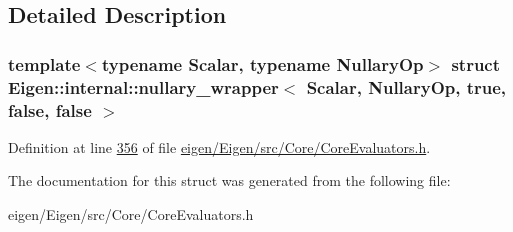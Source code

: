 \subsection{Detailed Description}
\subsubsection*{template$<$typename Scalar, typename Nullary\+Op$>$\newline
struct Eigen\+::internal\+::nullary\+\_\+wrapper$<$ Scalar, Nullary\+Op, true, false, false $>$}



Definition at line \hyperlink{eigen_2_eigen_2src_2_core_2_core_evaluators_8h_source_l00356}{356} of file \hyperlink{eigen_2_eigen_2src_2_core_2_core_evaluators_8h_source}{eigen/\+Eigen/src/\+Core/\+Core\+Evaluators.\+h}.



The documentation for this struct was generated from the following file\+:\begin{DoxyCompactItemize}
\item 
eigen/\+Eigen/src/\+Core/\+Core\+Evaluators.\+h\end{DoxyCompactItemize}
